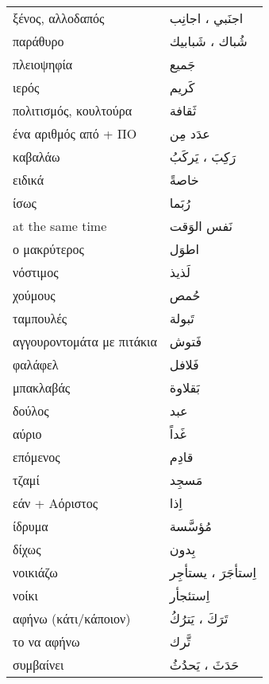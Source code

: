 \documentclass[twocolumn,a4paper]{article}
\newcommand{\ar}[1]{\textarabic{#1}}
\newcommand{\pl}{\raisebox{0.15ex}{\footnotesize ◍}}
\newcommand{\vrf}{\raisebox{0.15ex}{\footnotesize ◉}}
\newcommand{\mas}{\raisebox{0.15ex}{\footnotesize ◫}}
\begin{document}
\begin{mpsupertabular}{ P{0.5\textwidth} P{0.5\textwidth} }
ξένος, αλλοδαπός \pl         & \ar{ اجنَبي ، اجانِب } \\
παράθυρο \pl                 & \ar{ شُباك ، شَبابيك } \\
πλειοψηφία                   & \ar{ جَميع } \\
ιερός                        & \ar{ كَريم } \\
πολιτισμός, κουλτούρα        & \ar{ ثَقافة } \\
ένα αριθμός από + ΠΟ         & \ar{ عدَد مِن } \\
καβαλάω \vrf                 & \ar{ رَكِبَ ، يَركَبُ } \\
ειδικά                       & \ar{ خاصةً } \\
ίσως                         & \ar{ رُبَما } \\
at the same time             & \ar{ نَفس الوَقت } \\
ο μακρύτερος                 & \ar{ اطوَل } \\
νόστιμος                     & \ar{ لَذيذ } \\
χούμους                      & \ar{ حُمص } \\
ταμπουλές                    & \ar{ تَبولة } \\
αγγουροντομάτα με πιτάκια    & \ar{ فَتوش } \\
φαλάφελ                      & \ar{ فَلافل } \\
μπακλαβάς                    & \ar{ بَقلاوة } \\
δούλος                       & \ar{ عبد } \\
αύριο                        & \ar{ غَداً } \\
επόμενος                     & \ar{ قادِم } \\
τζαμί                        & \ar{ مَسجِد } \\
εάν + Αόριστος               & \ar{ اِذا } \\
ίδρυμα                       & \ar{ مُؤسَّسة } \\
δίχως                        & \ar{ بِدون } \\
νοικιάζω \vrf                & \ar{ اِستأجَرَ ، يستأجِر } \\
νοίκι \mas                   & \ar{ اِستئجأر } \\
αφήνω (κάτι/κάποιον) \vrf    & \ar{ تَرَكَ ، يَترُكُ } \\
το να αφήνω \mas             & \ar{ تَّرك } \\
συμβαίνει \vrf               & \ar{ حَدَثَ ، يَحدُثُ } \\

\end{mpsupertabular}
\end{document}
